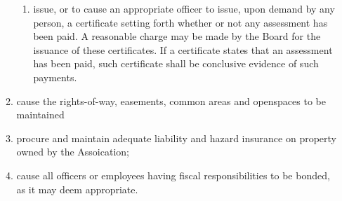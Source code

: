 \documentclass[12pt, letterpaper]{article}
\begin{document}
\begin{enumerate}
\begin{enumerate}
\begin{enumerate}
    \item issue, or to cause an appropriate officer to issue, upon demand by any person, a certificate setting forth whether or not any assessment has been paid.
     A reasonable charge may be made by the Board for the issuance of these certificates.
     If a certificate states that an assessment has been paid, such certificate shall be conclusive evidence of such payments.
   \end{enumerate}
   \item cause the rights-of-way, easements, common areas and openspaces to be maintained
   \item procure and maintain adequate liability and hazard insurance on property owned by the Assoication;
   \item cause all officers or employees having fiscal responsibilities to be bonded, as it may deem appropriate.
  \end{enumerate}
\end{enumerate}

\end{document}
